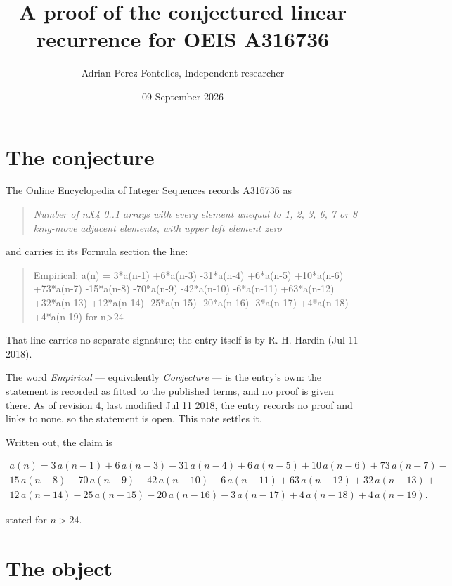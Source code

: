 \documentclass[11pt]{article}
\title{A proof of the conjectured linear recurrence for OEIS A316736}
\author{Adrian Perez Fontelles, Independent researcher}
\date{09 September 2026}
\theoremstyle{definition}
\begin{document}
\maketitle
\section{The conjecture}

The Online Encyclopedia of Integer Sequences records \href{https://oeis.org/A316736}{A316736} as

\begin{quote}\itshape Number of nX4 0..1 arrays with every element unequal to 1, 2, 3, 6, 7 or 8 king-move adjacent elements, with upper left element zero\end{quote}

and carries in its Formula section the line:

\begin{quote}\ttfamily Empirical: a(n) = 3*a(n-1) +6*a(n-3) -31*a(n-4) +6*a(n-5) +10*a(n-6) +73*a(n-7) -15*a(n-8) -70*a(n-9) -42*a(n-10) -6*a(n-11) +63*a(n-12) +32*a(n-13) +12*a(n-14) -25*a(n-15) -20*a(n-16) -3*a(n-17) +4*a(n-18) +4*a(n-19) for n>24\end{quote}

That line carries no separate signature; the entry itself is by R. H. Hardin (Jul 11 2018).

The word {\itshape Empirical} --- equivalently {\itshape Conjecture} --- is the entry's own: the statement is recorded as fitted to the published terms, and no proof is given there. As of revision 4, last modified Jul 11 2018, the entry records no proof and links to none, so the statement is open. This note settles it.

Written out, the claim is

\begin{multline*} a(n) = 3\,a(n-1) + 6\,a(n-3) - 31\,a(n-4) + 6\,a(n-5) + 10\,a(n-6) + 73\,a(n-7) - \\ 15\,a(n-8) - 70\,a(n-9) - 42\,a(n-10) - 6\,a(n-11) + 63\,a(n-12) + 32\,a(n-13) + \\ 12\,a(n-14) - 25\,a(n-15) - 20\,a(n-16) - 3\,a(n-17) + 4\,a(n-18) + 4\,a(n-19). \end{multline*}

stated for $n > 24$.

\section{The object}
\end{document}
